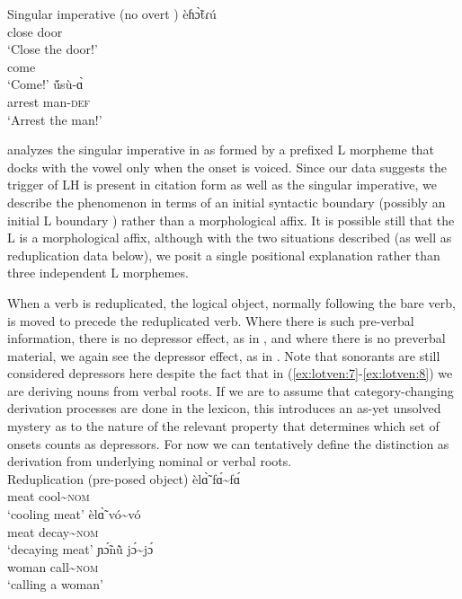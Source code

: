 \documentclass[output=paper
,newtxmath
,modfonts
,nonflat]{langsci/langscibook}
\begin{document}
\ea\label{ex:lotven:6}Singular imperative (no overt )
\ea\label{ex:lotven:6a}
     èɦɔ̃̀tɾú\\
    close door    \\
    \glt ‘Close the door!’
\ex\label{ex:lotven:6b}
	\\
	come\\
    \glt ‘Come!’
\ex\label{ex:lotven:6c}
	 ṹsù-ɑ̀\\
    arrest man-\textsc{def}\\
    \glt ‘Arrest the man!’
\z
\z

\citet{Bradshaw1999} analyzes the singular imperative in  as formed by a prefixed L  morpheme that docks with the vowel only when the onset is voiced. Since our data suggests the trigger of LH is present in citation form as well as the singular imperative, we describe the phenomenon in terms of an initial syntactic boundary (possibly an initial L boundary ) rather than a morphological affix. It is possible still that the L  is a morphological affix, although with the two situations described (as well as reduplication data below), we posit a single positional explanation rather than three independent L  morphemes. 

When a verb is reduplicated, the logical object, normally following the bare verb, is moved to precede the reduplicated verb. Where there is such pre-verbal information, there is no depressor effect, as in , and where there is no preverbal material, we again see the depressor effect, as in . Note that sonorants are still considered depressors here despite the fact that in (\ref{ex:lotven:7}-\ref{ex:lotven:8}) we are deriving nouns from verbal roots. If we are to assume that category-changing derivation processes are done in the lexicon, this introduces an as-yet unsolved mystery as to the nature of the relevant property that determines which set of onsets counts as depressors. For now we can tentatively define the distinction as derivation from underlying nominal or verbal roots. 
\\
\ea\label{ex:lotven:7}Reduplication (pre-posed object)
\ea\label{ex:lotven:7a}
    \gll èlɑ̃̀ {fɑ́}{\textasciitilde}fɑ́\\
    meat  cool{\textasciitilde}\textsc{nom} \\
    \glt ‘cooling meat’
\ex\label{ex:lotven:7b}
	\gll èlɑ̃̀ {vó}{\textasciitilde}vó\\
    meat decay{\textasciitilde}\textsc{nom}\\
    \glt ‘decaying meat’
\ex\label{ex:lotven:7c}
	\gll ɲɔ̃́nũ̀ {jɔ́}{\textasciitilde}jɔ́\\
	woman call{\textasciitilde}\textsc{nom}\\
    \glt ‘calling a woman’
\z
\z
\end{document}
